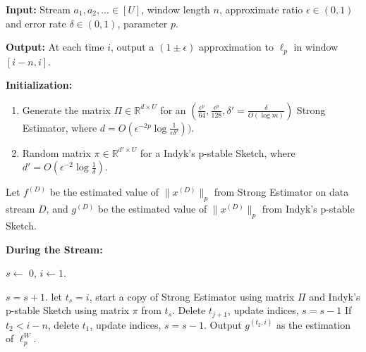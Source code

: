 \documentclass{article}
\newcommand{\from}{\leftarrow}
\newcommand{\est}{\textsf{Strong Estimator }}
\newcommand{\estt}{\textsf{Strong Estimator}}
\newcommand{\ind}{\textsf{Indyk's p-stable Sketch }}
\newcommand{\indd}{\textsf{Indyk's p-stable Sketch}}
\newcommand{\R}{\mathbb R}
\theoremstyle{plain}
\begin{document}
\begin{algorithm*}[t!]
\caption{\textbf{\textsf{Smooth Histogram with \est}}} \label{alg:reg1}

{\bf Input:} Stream $a_1, a_2, \dots \in [U] $, window length $n$, approximate ratio $\epsilon \in (0, 1)$ and error rate $\delta \in (0,1)$, parameter $p$.

{\bf Output:} At each time $i$, output a $(1\pm \epsilon)$ approximation to $\ell_p$  in window $[i - n, i]$.


{\bf Initialization:} \begin{enumerate}
    \item Generate the matrix $\Pi \in \R^{d \times U}$ for an $(\frac{\epsilon ^ p}{64}, \frac{\epsilon ^ p}{128}, \delta'=\frac {\delta}{O( \log m )})$ \estt, where $d = O(\epsilon ^ {-2p} \log \frac 1{\epsilon \delta'}))$. 

    \item Random matrix $\pi \in \R^{d'\times U}$ for a \indd, where $d' = O(\epsilon ^ {-2} \log \frac 1{\delta})$.  
\end{enumerate}

 Let $f ^ {(D)}$ be the estimated value of $\|x ^ {(D)}\|_p$ from \est on data stream $D$, and $g^ {(D)}$ be the estimated value of $\|x ^ {(D)}\|_p$ from \indd.

\noindent\makebox[\linewidth]{\rule{\paperwidth-10cm}{0.4pt}}

{\bf During the Stream:}
\begin{algorithmic}[1]
\State $ s \from$ 0, $i \from 1$.

    \State $s = s + 1$. 
    \State let $t_s = i$, start a copy of \est using matrix $\Pi$ and \ind using matrix $\pi$ from $t_s$. 
            \State Delete $t_{j + 1}$, update indices, $s = s -1$
        \EndWhile
    \EndFor
    \State If $t_2 < i - n$, delete $t_1$, update indices, $s = s -1$. 
    \State Output $g ^ {(t_2 , i)}$ as the estimation of $\ell_p ^ W$.
\EndFor

\end{algorithmic}
\end{algorithm*}
\end{document}
